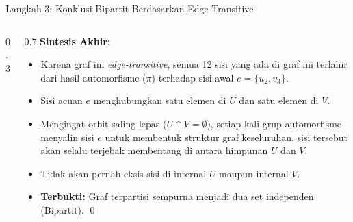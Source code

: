 \documentclass[aspectratio=169]{beamer}
\begin{document}
\begin{frame}[fragile]{Langkah 3: Konklusi Bipartit Berdasarkan Edge-Transitive}
  \begin{columns}
    \begin{column}{0.3\textwidth}
    \end{column}

    \begin{column}{0.7\textwidth}
      \small
      \textbf{Sintesis Akhir:}
      \begin{itemize}
        \item Karena graf ini \textit{edge-transitive}, semua 12 sisi yang ada di graf ini terlahir dari hasil automorfisme ($\pi$) terhadap sisi awal $e = \{u_2, v_3\}$.
        \item Sisi acuan $e$ menghubungkan satu elemen di $U$ dan satu elemen di $V$.
        \item Mengingat orbit saling lepas ($U \cap V = \emptyset$), setiap kali grup automorfisme menyalin sisi $e$ untuk membentuk struktur graf keseluruhan, sisi tersebut akan selalu terjebak membentang di antara himpunan $U$ dan $V$.
        \item Tidak akan pernah eksis sisi di internal $U$ maupun internal $V$.
        \item \textbf{Terbukti:} Graf terpartisi sempurna menjadi dua set independen (Bipartit). \qed
      \end{itemize}
    \end{column}
  \end{columns}
\end{frame}
\end{document}
